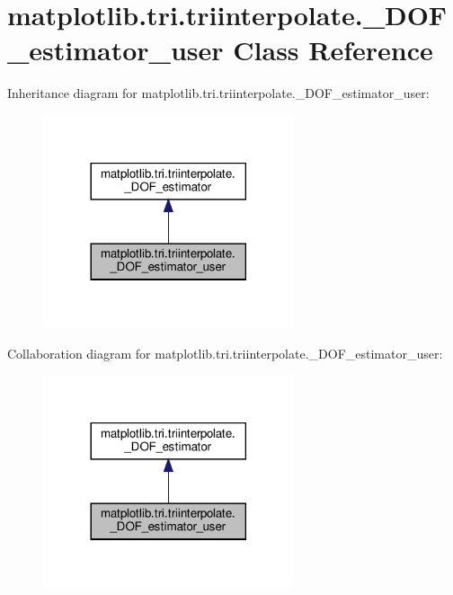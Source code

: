 \hypertarget{classmatplotlib_1_1tri_1_1triinterpolate_1_1__DOF__estimator__user}{}\section{matplotlib.\+tri.\+triinterpolate.\+\_\+\+D\+O\+F\+\_\+estimator\+\_\+user Class Reference}
\label{classmatplotlib_1_1tri_1_1triinterpolate_1_1__DOF__estimator__user}


Inheritance diagram for matplotlib.\+tri.\+triinterpolate.\+\_\+\+D\+O\+F\+\_\+estimator\+\_\+user\+:
\nopagebreak
\begin{figure}[H]
\begin{center}
\leavevmode
\includegraphics[width=209pt]{classmatplotlib_1_1tri_1_1triinterpolate_1_1__DOF__estimator__user__inherit__graph}
\end{center}
\end{figure}


Collaboration diagram for matplotlib.\+tri.\+triinterpolate.\+\_\+\+D\+O\+F\+\_\+estimator\+\_\+user\+:
\nopagebreak
\begin{figure}[H]
\begin{center}
\leavevmode
\includegraphics[width=209pt]{classmatplotlib_1_1tri_1_1triinterpolate_1_1__DOF__estimator__user__coll__graph}
\end{center}
\end{figure}
